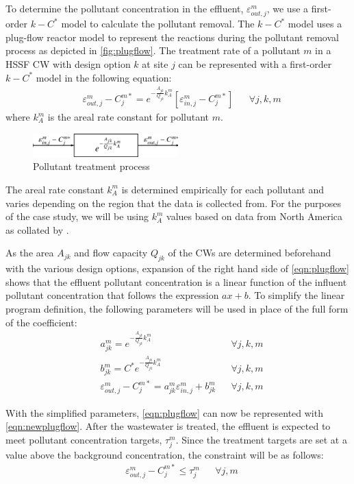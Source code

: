 \documentclass[preprint,12pt,authoryear]{elsarticle}
\begin{document}
To determine the pollutant concentration in the effluent, $\varepsilon_{out,j}^m$, we use a first-order $k-C^*$ model \citep{rousseau2004model} to calculate the pollutant removal. The $k-C^*$ model uses a plug-flow reactor model to represent the reactions during the pollutant removal process as depicted in \autoref{fig:plugflow}. The treatment rate of a pollutant $m$ in a HSSF CW with design option $k$ at site $j$ can be represented with a first-order $k-C^*$ model in the following equation:
\begin{align}
	\label{eqn:plugflow}
	&\varepsilon_{out,j}^m - C_j^{m*} = e^{-\frac{A_{jk}}{Q_{jk}}k_A^m} [\varepsilon_{in,j}^m - C_j^{m*}] && \forall j,k,m
\end{align}
where $k_A^m$ is the areal rate constant for pollutant $m$.

\begin{figure}[!htpb]
	\centering
	\includegraphics[width=0.5\textwidth]{plugflow.png}
	\caption{Pollutant treatment process}
	\label{fig:plugflow}
\end{figure}

The areal rate constant $k_A^m$ is determined empirically for each pollutant and varies depending on the region that the data is collected from. For the purposes of the case study, we will be using $k_A^m$ values based on data from North America as collated by \cite{vymazal2008}. 

As the area $A_{jk}$ and flow capacity $Q_{jk}$ of the CWs are determined beforehand with the various design options, expansion of the right hand side of \autoref{eqn:plugflow} shows that the effluent pollutant concentration is a linear function of the influent pollutant concentration that follows the expression $ax+b$. To simplify the linear program definition, the following parameters will be used in place of the full form of the coefficient: 
\begin{align}
	&a_{jk}^m = e^{-\frac{A_{jk}}{Q_{jk}}k_A^m} &&\forall j,k,m\nonumber\\
	&b_{jk}^m = C^* e^{-\frac{A_{jk}}{Q_{jk}}k_A^m} &&\forall j,k,m\nonumber\\
	&\varepsilon_{out,j}^m - C_j^{m*} = a_{jk}^m \varepsilon_{in,j}^m + b_{jk}^m && \forall j,k,m \label{eqn:newplugflow}
\end{align}

With the simplified parameters, \autoref{eqn:plugflow} can now be represented with \autoref{eqn:newplugflow}. After the wastewater is treated, the effluent is expected to meet pollutant concentration targets, $\tau_j^m$. Since the treatment targets are set at a value above the background concentration, the constraint will be as follows:
\begin{align}
	&\varepsilon_{out,j}^m - C_j^{m*} \leq \tau_j^m && \forall j,m \label{eqn:target}
\end{align}
\end{document}

